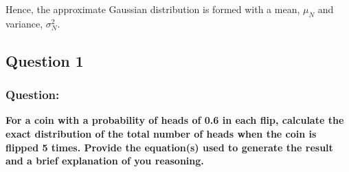 \documentclass[12pt,twoside,a4paper]{article}
\begin{document}
Hence, the approximate Gaussian distribution is formed with a mean, $\mu_N$ and variance, $\sigma^2_N$.
\subsection{Question 1}

\subsubsection*{Question:}
\textbf{For a coin with a probability of heads of 0.6 in each flip, calculate the exact distribution of the total number of heads when the coin is flipped 5 times. Provide the equation(s) used to generate the result and a brief explanation of you reasoning.}
\end{document}
